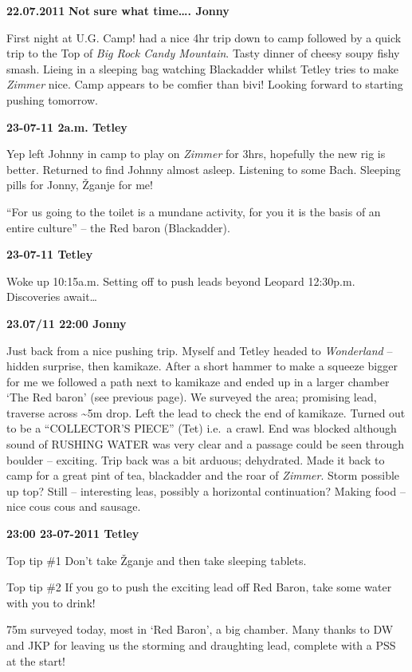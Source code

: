 \textbf{22.07.2011} \textbf{Not} \textbf{sure what time\ldots{}. Jonny}

First night at U.G. Camp! had a nice 4hr trip down to camp followed by a
quick trip to the Top of \emph{Big Rock Candy Mountain}. Tasty dinner of
cheesy soupy fishy smash. Lieing in a sleeping bag watching Blackadder
whilst Tetley tries to make \emph{Zimmer} nice. Camp appears to be
comfier than bivi! Looking forward to starting pushing tomorrow.

\textbf{23-07-11 2a.m. Tetley}

Yep left Johnny in camp to play on \emph{Zimmer} for 3hrs, hopefully the
new rig is better. Returned to find Johnny almost asleep. Listening to
some Bach. Sleeping pills for Jonny, Žganje for me!

``For us going to the toilet is a mundane activity, for you it is the
basis of an entire culture'' -- the Red baron (Blackadder).

\textbf{23-07-11 Tetley}

Woke up 10:15a.m. Setting off to push leads beyond Leopard 12:30p.m.
Discoveries await\ldots{}

\textbf{23.07/11 22:00 Jonny}

Just back from a nice pushing trip. Myself and Tetley headed to
\emph{Wonderland} -- hidden surprise, then kamikaze. After a short
hammer to make a squeeze bigger for me we followed a path next to
kamikaze and ended up in a larger chamber `The Red baron' (see previous
page). We surveyed the area; promising lead, traverse across
\textasciitilde{}5m drop. Left the lead to check the end of kamikaze.
Turned out to be a ``COLLECTOR'S PIECE'' (Tet) i.e.~a crawl. End was
blocked although sound of RUSHING WATER was very clear and a passage
could be seen through boulder -- exciting. Trip back was a bit arduous;
dehydrated. Made it back to camp for a great pint of tea, blackadder and
the roar of \emph{Zimmer}. Storm possible up top? Still -- interesting
leas, possibly a horizontal continuation? Making food -- nice cous cous
and sausage.

\textbf{23:00 23-07-2011 Tetley}

Top tip \#1 Don't take Žganje and then take sleeping tablets.

Top tip \#2 If you go to push the exciting lead off Red Baron, take some
water with you to drink!

75m surveyed today, most in `Red Baron', a big chamber. Many thanks to
DW and JKP for leaving us the storming and draughting lead, complete
with a PSS at the start!

